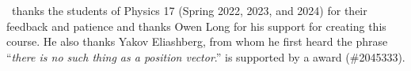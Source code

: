 \documentclass[12pt, oneside]{report}    %
\let\oldsection\section
\def\section{%
  \setcounter{sidenote}{1}%
  \oldsection
}
\begin{document}
\ thanks the students of Physics 17 (Spring 2022, 2023, and 2024) for their feedback and patience and thanks Owen Long for his support for creating this course. He also thanks Yakov Eliashberg, from whom he first heard the phrase ``\emph{there is no such thing as a position vector}.''
%
 is supported by a  award (\#2045333).

\appendix





\printindex

% 
\end{document}
